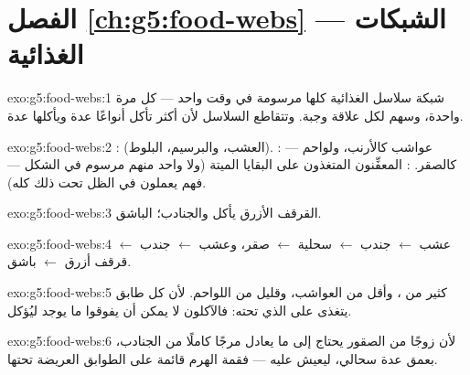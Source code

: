 \section*{الفصل \ref{ch:g5:food-webs} --- الشبكات الغذائية}

\begin{solution}{exo:g5:food-webs:1}
شبكة سلاسل  الغذائية كلها مرسومة في وقت واحد --- كل  مرة
واحدة، وسهم لكل علاقة وجبة. وتتقاطع السلاسل لأن أكثر 
تأكل أنواعًا عدة ويأكلها  عدة.
\end{solution}

\begin{solution}{exo:g5:food-webs:2}
:  (العشب، والبرسيم،  البلوط).
:  --- عواشب كالأرنب، ولواحم كالصقر.
: المعفِّنون المتغذون على البقايا الميتة (ولا واحد منهم
مرسوم في الشكل --- فهم يعملون في الظل تحت ذلك كله).
\end{solution}

\begin{solution}{exo:g5:food-webs:3}
القرقف الأزرق يأكل  والجنادب؛  الباشق.
\end{solution}

\begin{solution}{exo:g5:food-webs:4}
عشب $\leftarrow$ جندب $\leftarrow$ سحلية
$\leftarrow$ صقر، وعشب $\leftarrow$ جندب
$\leftarrow$ قرقف أزرق $\leftarrow$ باشق.
\end{solution}

\begin{solution}{exo:g5:food-webs:5}
كثير من ، وأقل من العواشب، وقليل من اللواحم. لأن كل طابق
يتغذى على الذي تحته: فالآكلون لا يمكن أن يفوقوا ما يوجد ليُؤكل.
\end{solution}

\begin{solution}{exo:g5:food-webs:6}
لأن زوجًا من الصقور يحتاج إلى ما يعادل مرجًا كاملًا من الجنادب،
بعمق عدة سحالي، ليعيش عليه --- فقمة الهرم قائمة على الطوابق
العريضة تحتها.
\end{solution}

